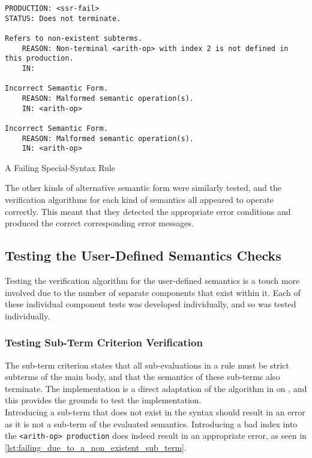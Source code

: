 \begin{listing}[!htb]
\begin{verbatim}
PRODUCTION: <ssr-fail>
STATUS: Does not terminate.

Refers to non-existent subterms.
    REASON: Non-terminal <arith-op> with index 2 is not defined in this production.
    IN:

Incorrect Semantic Form.
    REASON: Malformed semantic operation(s).
    IN: <arith-op>

Incorrect Semantic Form.
    REASON: Malformed semantic operation(s).
    IN: <arith-op>
\end{verbatim}
\caption{A Failing Special-Syntax Rule}
\label{lst:a_failing_special_syntax_rule}
\end{listing}

The other kinds of alternative semantic form were similarly tested, and the verification algorithms for each kind of semantics all appeared to operate correctly.
This meant that they detected the appropriate error conditions and produced the correct corresponding error messages.


\subsection{Testing the User-Defined Semantics Checks} %
\label{sub:testing_the_user_defined_semantics_checks}
Testing the verification algorithm for the user-defined semantics is a touch more involved due to the number of separate components that exist within it. 
Each of these individual component tests was developed individually, and so was tested individually. 

\subsubsection{Testing Sub-Term Criterion Verification} %
\label{ssub:testing_sub_term_criterion_verification}
The sub-term criterion states that all sub-evaluations in a rule must be strict subterms of the main body, and that the semantics of these sub-terms also terminate. 
The implementation is a direct adaptation of the algorithm in  on , and this provides the grounds to test the implementation.\\

Introducing a sub-term that does not exist in the syntax should result in an error as it is not a sub-term of the evaluated semantics.
Introducing a bad index into the \texttt{<arith-op> production} does indeed result in an appropriate error, as seen in \autoref{lst:failing_due_to_a_non_existent_sub_term}.

